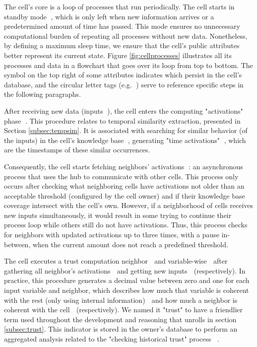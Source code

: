 The cell's core is a loop of processes that run periodically. The cell starts in standby mode \textcircled{}, which is only left when new information arrives or a predetermined amount of time has passed. This mode ensures no unnecessary computational burden of repeating all processes without new data. Nonetheless, by defining a maximum sleep time, we ensure that the cell's public attributes better represent its current state. Figure \ref{fig:cellprocesses} illustrates all its processes and data in a flowchart that goes over its loop from top to bottom. The symbol on the top right of some attributes indicates which persist in the cell's database, and the circular letter tags (e.g. \textcircled{}) serve to reference specific steps in the following paragraphs.

After receiving new data (inputs \textcircled{}), the cell enters the computing "activations" phase \textcircled{}. This procedure relates to temporal similarity extraction, presented in Section \ref{subsec:tempsim}. It is associated with searching for similar behavior (of the inputs) in the cell's knowledge base \textcircled{}, generating "time activations" \textcircled{}, which are the timestamps of these similar occurrences.

Consequently, the cell starts fetching neighbors' activations \textcircled{}: an asynchronous process that uses the hub to communicate with other cells. This process only occurs after checking what neighboring cells have activations not older than an acceptable threshold (configured by the cell owner) and if their knowledge base coverage intersect with the cell's own. However, if a neighborhood of cells receives new inputs simultaneously, it would result in some trying to continue their process loop while others still do not have activations. Thus, this process checks for neighbors with updated activations up to three times, with a pause in-between, when the current amount does not reach a predefined threshold.

The cell executes a trust computation neighbor \textcircled{} and variable-wise \textcircled{} after gathering all neighbor's activations \textcircled{} and getting new inputs \textcircled{} (respectively). In practice, this procedure generates a decimal value between zero and one for each input variable and neighbor, which describes how much that variable is coherent with the rest (only using internal information) \textcircled{} and how much a neighbor is coherent with the cell \textcircled{} (respectively). We named it "trust" to have a friendlier term used throughout the development and reasoning that unrolls in section \ref{subsec:trust}. This indicator is stored in the owner's database to perform an aggregated analysis related to the "checking historical trust" process \textcircled{}\textcircled{}.

